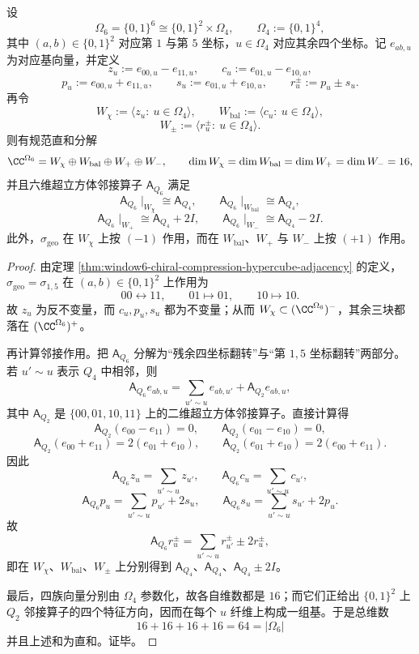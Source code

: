 \begin{theorem}\label{thm:conclusion-window6-sigma-geo-fourblock-normal-form}
设
\[
\Omega_6=\{0,1\}^6\cong \{0,1\}^2\times \Omega_4,
\qquad
\Omega_4:=\{0,1\}^4,
\]
其中 \((a,b)\in\{0,1\}^2\) 对应第 \(1\) 与第 \(5\) 坐标，\(u\in\Omega_4\) 对应其余四个坐标。记 \(e_{ab,u}\) 为对应基向量，并定义
\[
z_u:=e_{00,u}-e_{11,u},
\qquad
c_u:=e_{01,u}-e_{10,u},
\]
\[
p_u:=e_{00,u}+e_{11,u},
\qquad
s_u:=e_{01,u}+e_{10,u},
\qquad
r_u^{\pm}:=p_u\pm s_u.
\]
再令
\[
W_\chi:=\langle z_u:\ u\in\Omega_4\rangle,
\qquad
W_{\mathrm{bal}}:=\langle c_u:\ u\in\Omega_4\rangle,
\]
\[
W_{\pm}:=\langle r_u^{\pm}:\ u\in\Omega_4\rangle.
\]
则有规范直和分解
\[
\CC^{\Omega_6}
=
W_\chi\oplus W_{\mathrm{bal}}\oplus W_+\oplus W_-,
\qquad
\dim W_\chi=\dim W_{\mathrm{bal}}=\dim W_+=\dim W_-=16,
\]
并且六维超立方体邻接算子 \(\mathsf A_{Q_6}\) 满足
\[
\mathsf A_{Q_6}\!\mid_{W_\chi}\cong \mathsf A_{Q_4},
\qquad
\mathsf A_{Q_6}\!\mid_{W_{\mathrm{bal}}}\cong \mathsf A_{Q_4},
\]
\[
\mathsf A_{Q_6}\!\mid_{W_+}\cong \mathsf A_{Q_4}+2I,
\qquad
\mathsf A_{Q_6}\!\mid_{W_-}\cong \mathsf A_{Q_4}-2I.
\]
此外，\(\sigma_{\mathrm{geo}}\) 在 \(W_\chi\) 上按 \((-1)\) 作用，而在 \(W_{\mathrm{bal}}\)、\(W_+\) 与 \(W_-\) 上按 \((+1)\) 作用。
\end{theorem}
\begin{proof}
由定理 \ref{thm:window6-chiral-compression-hypercube-adjacency} 的定义，\(\sigma_{\mathrm{geo}}=\sigma_{1,5}\) 在 \((a,b)\in\{0,1\}^2\) 上作用为
\[
00\longleftrightarrow 11,
\qquad
01\longmapsto 01,
\qquad
10\longmapsto 10.
\]
故 \(z_u\) 为反不变量，而 \(c_u,p_u,s_u\) 都为不变量；从而 \(W_\chi\subset (\CC^{\Omega_6})^{-}\)，其余三块都落在 \((\CC^{\Omega_6})^{+}\)。

再计算邻接作用。把 \(\mathsf A_{Q_6}\) 分解为“残余四坐标翻转”与“第 \(1,5\) 坐标翻转”两部分。若 \(u'\sim u\) 表示 \(Q_4\) 中相邻，则
\[
\mathsf A_{Q_6}e_{ab,u}
=
\sum_{u'\sim u} e_{ab,u'}
+\mathsf A_{Q_2}e_{ab,u},
\]
其中 \(\mathsf A_{Q_2}\) 是 \(\{00,01,10,11\}\) 上的二维超立方体邻接算子。直接计算得
\[
\mathsf A_{Q_2}(e_{00}-e_{11})=0,
\qquad
\mathsf A_{Q_2}(e_{01}-e_{10})=0,
\]
\[
\mathsf A_{Q_2}(e_{00}+e_{11})=2(e_{01}+e_{10}),
\qquad
\mathsf A_{Q_2}(e_{01}+e_{10})=2(e_{00}+e_{11}).
\]
因此
\[
\mathsf A_{Q_6}z_u=\sum_{u'\sim u}z_{u'},
\qquad
\mathsf A_{Q_6}c_u=\sum_{u'\sim u}c_{u'},
\]
\[
\mathsf A_{Q_6}p_u=\sum_{u'\sim u}p_{u'}+2s_u,
\qquad
\mathsf A_{Q_6}s_u=\sum_{u'\sim u}s_{u'}+2p_u.
\]
故
\[
\mathsf A_{Q_6}r_u^{\pm}
=
\sum_{u'\sim u}r_{u'}^{\pm}\pm 2r_u^{\pm},
\]
即在 \(W_\chi\)、\(W_{\mathrm{bal}}\)、\(W_\pm\) 上分别得到 \(\mathsf A_{Q_4}\)、\(\mathsf A_{Q_4}\)、\(\mathsf A_{Q_4}\pm 2I\)。

最后，四族向量分别由 \(\Omega_4\) 参数化，故各自维数都是 \(16\)；而它们正给出 \(\{0,1\}^2\) 上 \(Q_2\) 邻接算子的四个特征方向，因而在每个 \(u\) 纤维上构成一组基。于是总维数
\[
16+16+16+16=64=|\Omega_6|
\]
并且上述和为直和。证毕。
\end{proof}

